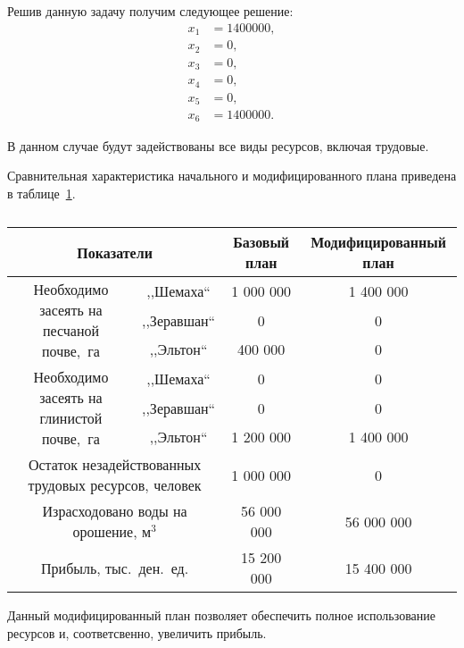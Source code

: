 Решив данную задачу получим следующее решение:
\begin{equation}
	\begin{aligned}
		x_1 &= 1 400 000, \\
		x_2 &= 0, \\
		x_3 &= 0, \\
		x_4 &= 0, \\
		x_5 &= 0, \\
		x_6 &= 1 400 000.
	\end{aligned}
\end{equation}

В данном случае будут задействованы все виды ресурсов, включая трудовые.

Сравнительная характеристика начального и модифицированного плана приведена в таблице~\ref{tbl:modif}.

\renewcommand{\tabcolsep}{0.5em}

\begin{table}[h]
  \caption{\label{tbl:modif}}
  \centering
    \begin{tabular}{|c|c|c|c|}
      \hline
      
      \multicolumn{2}{|c|}{Показатели} & \centering Базовый план & Модифицированный план  \\ \hline 
      \multirow{3}{3.5cm}{Необходимо засеять на песчаной почве,~га} & ,,Шемаха`` & 1 000 000 & 1 400 000 \\
      & ,,Зеравшан`` & 0 & 0 \\
      & ,,Эльтон`` & 400 000 & 0 \\  \hline

      \multirow{3}{3.5cm}{Необходимо засеять на глинистой почве,~га} & ,,Шемаха`` & 0 & 0 \\
      & ,,Зеравшан`` & 0 & 0 \\
      & ,,Эльтон`` & 1 200 000 & 1 400 000 \\  \hline

			\multicolumn{2}{|p{6cm}|}{Остаток незадействованных трудовых ресурсов, человек} & 1 000 000 & 0 \\ \hline     
      
      \multicolumn{2}{|p{6cm}|}{Израсходовано воды	на орошение, $\text{м}^3$ } & 56 000 000 & 56 000 000 \\ \hline

    	\multicolumn{2}{|p{6cm}|}{Прибыль, тыс.~ден.~ед.} & 15 200 000 & 15 400 000 \\

      \hline
      \end{tabular}
\end{table}

Данный модифицированный план позволяет обеспечить полное использование ресурсов и, соответсвенно, увеличить прибыль.

\pagebreak